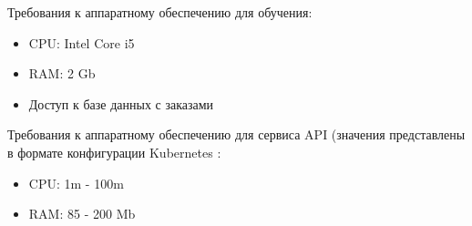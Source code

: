 Требования к аппаратному обеспечению для обучения:
\begin{itemize}
  \item CPU: Intel Core i5
  \item RAM: 2 Gb
  \item Доступ к базе данных с заказами
\end{itemize}

Требования к аппаратному обеспечению для сервиса API (значения представлены в
формате конфигурации Kubernetes
:
\begin{itemize}
  \item CPU: 1m - 100m
  \item RAM: 85 - 200 Mb
\end{itemize}
